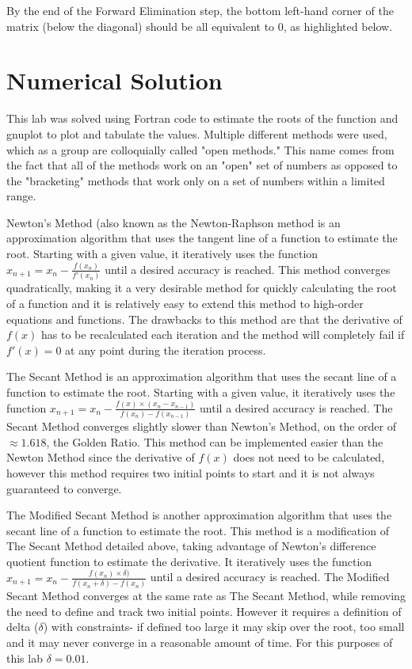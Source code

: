 \documentclass[12pt, letterpaper]{article}
\begin{document}
	 By the end of the Forward Elimination step, the bottom left-hand corner of the matrix (below the diagonal) should be all equivalent to 0, as highlighted below.
	 
	 
\section{Numerical Solution}
	This lab was solved using Fortran code to estimate the roots of the function and gnuplot to plot and tabulate the values. Multiple different methods were used, which as a group are colloquially called "open methods." This name comes from the fact that all of the methods work on an "open" set of numbers as opposed to the "bracketing" methods that work only on a set of numbers within a limited range.
	
	Newton's Method (also known as the Newton-Raphson method is an approximation algorithm that uses the tangent line of a function to estimate the root. Starting with a given value, it iteratively uses the function $x_{n+1}=x_n-\frac{f(x_n)}{f'(x_n)}$ until a desired accuracy is reached. This method converges quadratically, making it a very desirable method for quickly calculating the root of a function and it is relatively easy to extend this method to high-order equations and functions. The drawbacks to this method are that the derivative of $f(x)$ has to be recalculated each iteration and the method will completely fail if $f'(x)=0$ at any point during the iteration process.
	
	The Secant Method is an approximation algorithm that uses the secant line of a function to estimate the root. Starting with a given value, it iteratively uses the function $x_{n+1}=x_n-\frac{f(x)\times(x_n-x_{n-1})}{f(x_n)-f(x_{n-1})}$ until a desired accuracy is reached. The Secant Method converges slightly slower than Newton's Method, on the order of ${\approx}1.618$, the Golden Ratio. This method can be implemented easier than the Newton Method since the derivative of $f(x)$ does not need to be calculated, however this method requires two initial points to start and it is not always guaranteed to converge.
	
	The Modified Secant Method is another approximation algorithm that uses the secant line of a function to estimate the root. This method is a modification of The Secant Method detailed above, taking advantage of Newton's difference quotient function to estimate the derivative. It iteratively uses the function $x_{n+1}=x_n-\frac{f(x_n)\times\delta)}{f(x_n+\delta)-f(x_n)}$ until a desired accuracy is reached. The Modified Secant Method converges at the same rate as The Secant Method, while removing the need to define and track two initial points. However it requires a definition of delta ($\delta$) with constraints- if defined too large it may skip over the root, too small and it may never converge in a reasonable amount of time. For this purposes of this lab $\delta=0.01$.
	
\end{document}

